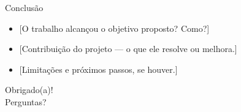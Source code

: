 \documentclass[12pt,aspectratio=169]{beamer}
\begin{document}
\begin{frame}{Conclusão}
  \begin{itemize}
    \item {[}O trabalho alcançou o objetivo proposto? Como?{]}
    \item {[}Contribuição do projeto — o que ele resolve ou melhora.{]}
    \item {[}Limitações e próximos passos, se houver.{]}
  \end{itemize}
\end{frame}

\begin{frame}[standout]
  Obrigado(a)!\\[0.3cm]
  \Large Perguntas?
\end{frame}
\end{document}
